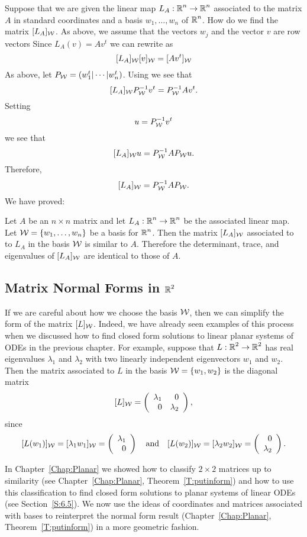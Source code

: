 \documentclass{ximera}
\begin{document}
Suppose that we are given the linear map $L_A:\mbox{$\Bbb{R}$}^n\to\mbox{$\Bbb{R}$}^n$ associated to
the matrix $A$ in standard coordinates and a basis $w_1,\ldots,w_n$ of $\mbox{$\Bbb{R}$}^n$.
How do we find the matrix $[L_A]_{\cal W}$. As above, we assume that the
vectors $w_j$ and the vector $v$ are row vectors  Since $L_A(v)=Av^t$ we can
rewrite  as
\[
[L_A]_{\cal W}[v]_{\cal W} = [Av^t]_{\cal W}
\]
As above, let $P_{\cal W}=(w_1^t|\cdots|w_n^t)$.  Using  we
see that
\[
[L_A]_{\cal W}P_{\cal W}^{-1} v^t = P_{\cal W}^{-1} Av^t.
\]
Setting
\[
u= P_{\cal W}^{-1} v^t
\]
we see that
\[
[L_A]_{\cal W}u = P_{\cal W}^{-1} A P_{\cal W}u.
\]
Therefore,
\[
[L_A]_{\cal W} = P_{\cal W}^{-1} AP_{\cal W}.
\]
We have proved:
\begin{thm}
Let $A$ be an $n\times n$ matrix and let $L_A:\mbox{$\Bbb{R}$}^n\to\mbox{$\Bbb{R}$}^n$ be the associated
linear map.  Let ${\cal W} = \{w_1,\ldots,w_n\}$ be a basis for
$\mbox{$\Bbb{R}$}^n$.  Then the matrix $[L_A]_{\cal W}$ associated to to $L_A$ in the basis
${\cal W}$ is similar to $A$.  Therefore the determinant, trace,
and eigenvalues of $[L_A]_{\cal W}$ are identical to those of $A$.
\end{thm}




\subsection*{Matrix Normal Forms in $\mbox{$\Bbb{R}$}^2$} 

If we are careful about how we choose the basis ${\cal W}$, then
we can simplify the form of the matrix $[L]_{\cal W}$.  Indeed, we
have already seen examples of this process when we discussed how
to find closed form solutions to linear planar systems of ODEs in
the previous chapter.  For example, suppose that $L:\mbox{$\Bbb{R}$}^2\to\mbox{$\Bbb{R}$}^2$
has real eigenvalues $\lambda_1$ and $\lambda_2$ with two
linearly independent eigenvectors $w_1$ and $w_2$.  Then the
matrix associated to $L$ in the basis ${\cal W} = \{w_1,w_2\}$
is the diagonal matrix
\begin{equation}   \label{e:diagcoord}
[L]_{\cal W} = \left(\begin{array}{rr} \lambda_1 & 0\\ 0 &\lambda_2\end{array}\right),
\end{equation}
since
\[
[L(w_1)]_{\cal W} = [\lambda_1w_1]_{\cal W} = \left(\begin{array}{r} \lambda_1 \\ 0\end{array}\right) \quad\mbox{and}\quad
[L(w_2)]_{\cal W} = [\lambda_2w_2]_{\cal W} = \left(\begin{array}{r} 0 \\ \lambda_2\end{array}\right).
\]

In Chapter~\ref{Chap:Planar} we showed how to classify $2\times 2$
matrices up to similarity (see Chapter~\ref{Chap:Planar},
Theorem~\ref{T:putinform}) and how to use this classification to find
closed form solutions to planar systems of linear ODEs (see
Section~\ref{S:6.5}).  We now use
the ideas of coordinates and matrices associated with bases to
reinterpret the normal form result (Chapter~\ref{Chap:Planar},
Theorem~\ref{T:putinform}) in a more geometric fashion.
\end{document}
